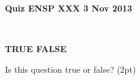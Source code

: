 \documentclass[12pt, oneside]{article}
\newif\ifsolution
\newcommand{\tf}[1]
{
\vfill
\parbox[t]{0.25\textwidth}{\bf TRUE \hspace{0.1 in} FALSE }
\parbox[t]{0.75\textwidth}{#1 (2pt)}
}
\newcommand{\solution}[1]
{\ifsolution
Answer: {\it #1}
\else\fi}
\begin{document}
{\bf Quiz \hfill ENSP XXX \hfill 3 Nov 2013 }

\framebox[4.5in]{\rule{0cm}{1.5cm}}\\


\vfill



\tf{Is this question true or false?}
\solution{False}

\vfill
\end{document}
